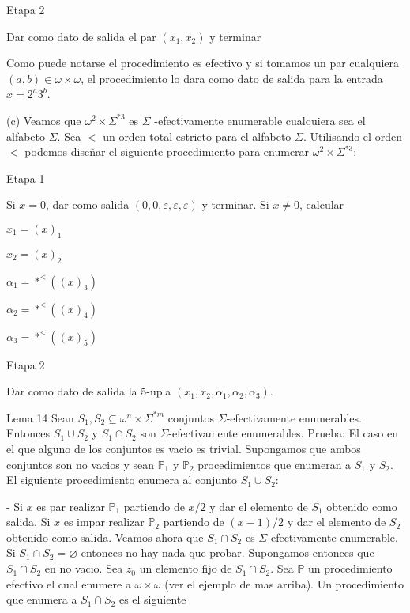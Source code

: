 Etapa 2

Dar como dato de salida el par \((x_{1},x_{2})\) y terminar

Como puede notarse el procedimiento es efectivo y si tomamos un par cualquiera \((a,b)\in \omega \times \omega \), el procedimiento lo dara como dato de salida para la entrada \(x=2^{a}3^{b}\).

(c) Veamos que \(\omega ^{2}\times \Sigma ^{\ast 3}\) es \(\Sigma \) -efectivamente enumerable cualquiera sea el alfabeto \(\Sigma \). Sea \(< \) un orden total estricto para el alfabeto \(\Sigma \). Utilisando el orden \(< \) podemos dise\~{n}ar el siguiente procedimiento para enumerar \(\omega ^{2}\times \Sigma ^{\ast 3}\):

Etapa 1

Si \(x=0\), dar como salida \((0,0,\varepsilon ,\varepsilon ,\varepsilon )\) y terminar. Si \(x\neq 0\), calcular

\(x_{1}=(x)_{1}\)

\(x_{2}=(x)_{2}\)

\(\alpha _{1}=\ast ^{< }((x)_{3})\)

\(\alpha _{2}=\ast ^{< }((x)_{4})\)

\(\alpha _{3}=\ast ^{< }((x)_{5})\)

Etapa 2

Dar como dato de salida la 5-upla \((x_{1},x_{2},\alpha _{1},\alpha _{2},\alpha _{3})\).

Lema 14 Sean \(S_{1},S_{2}\subseteq \omega ^{n}\times \Sigma ^{\ast m}\) conjuntos \( \Sigma \)-efectivamente enumerables. Entonces \(S_{1}\cup S_{2}\) y \(S_{1}\cap S_{2}\) son \(\Sigma \)-efectivamente enumerables.
Prueba: El caso en el que alguno de los conjuntos es vacio es trivial. Supongamos que ambos conjuntos son no vacios y sean \(\mathbb{P}_{1}\) y \(\mathbb{P}_{2}\) procedimientos que enumeran a \(S_{1}\) y \(S_{2}\). El siguiente procedimiento enumera al conjunto \(S_{1}\cup S_{2}\):

- Si \(x\) es par realizar \(\mathbb{P}_{1}\) partiendo de \(x/2\) y dar el elemento de \(S_{1}\) obtenido como salida. Si \(x\) es impar realizar \(\mathbb{P }_{2}\) partiendo de \((x-1)/2\) y dar el elemento de \(S_{2}\) obtenido como salida.
Veamos ahora que \(S_{1}\cap S_{2}\) es \(\Sigma \)-efectivamente enumerable. Si \(S_{1}\cap S_{2}=\varnothing \) entonces no hay nada que probar. Supongamos entonces que \(S_{1}\cap S_{2}\) en no vacio. Sea \(z_{0}\) un elemento fijo de \( S_{1}\cap S_{2}.\) Sea \(\mathbb{P}\) un procedimiento efectivo el cual enumere a \(\omega \times \omega \) (ver el ejemplo de mas arriba). Un procedimiento que enumera a \(S_{1}\cap S_{2}\) es el siguiente

